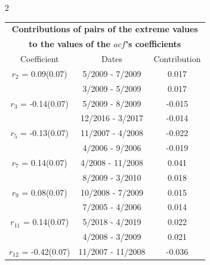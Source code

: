 
\thispagestyle{empty}
\begin{multicols}{2}{ 
\begin{tabular}{ccc}
\multicolumn{3}{c}{\textbf{Contributions of pairs of the extreme values} }  \vspace{-.10in}  \\ 
\multicolumn{3}{c}{ \textbf{to the values of the $acf$'s coefficients}} \\ 
\hline 
\hline                  Coefficient  &  Dates &  Contribution \\ 
\hline 
  $r_{ 2}$ = 0.09(0.07) &       5/2009 -  7/2009 &        0.017   \vspace{-.10in} \\  
&        3/2009 -  5/2009 &        0.017  \vspace{-.02in} \\ \hline 
  $r_{ 3}$ = -0.14(0.07) &       5/2009 -  8/2009 &       -0.015    \vspace{-.10in} \\ 
  &       12/2016 -  3/2017 &       -0.014  \vspace{-.02in}   \\ \hline 
    $r_{ 5}$ = -0.13(0.07) &      11/2007 -  4/2008 &       -0.022    \vspace{-.10in} \\ 
  &        4/2006 -  9/2006 &       -0.019  \vspace{-.02in}   \\ \hline 
    $r_{ 7}$ = 0.14(0.07) &       4/2008 - 11/2008 &        0.041   \vspace{-.10in} \\  
&        8/2009 -  3/2010 &        0.018  \vspace{-.02in} \\ \hline 
  $r_{ 9}$ = 0.08(0.07) &      10/2008 -  7/2009 &        0.015   \vspace{-.10in} \\  
&        7/2005 -  4/2006 &        0.014  \vspace{-.02in} \\ \hline 
  $r_{11}$ = 0.14(0.07) &       5/2018 -  4/2019 &        0.022   \vspace{-.10in} \\  
&        4/2008 -  3/2009 &        0.021  \vspace{-.02in} \\ \hline 
  $r_{12}$ = -0.42(0.07) &      11/2007 - 11/2008 &       -0.036    \vspace{-.10in} \\ 

\end{tabular}}
\end{multicols}
